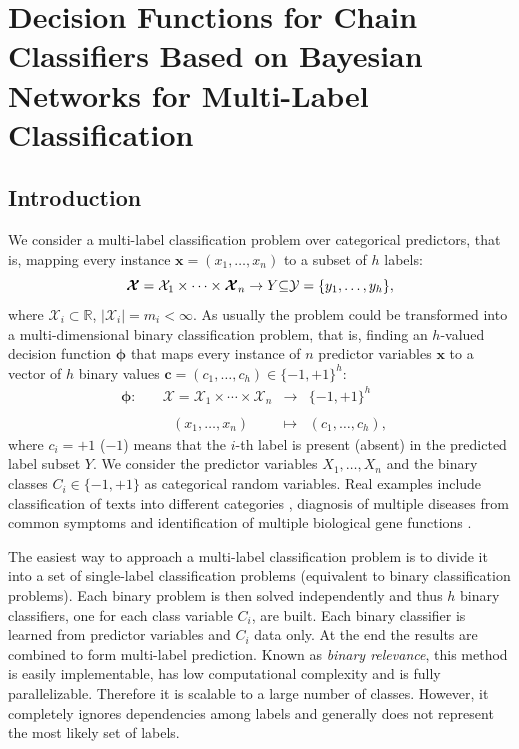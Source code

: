 \documentclass[11pt,a4paper, twoside]{book}
\newcommand{\bchi}{\boldsymbol{\mathcal{X}}}
\newcommand{\nchi}{\mathcal{X}}
\begin{document}
\chapter{Decision Functions for Chain Classifiers Based on Bayesian Networks for Multi-Label Classification}

\label{chp:multilabel}

\section{Introduction}
We consider a multi-label classification problem \citep{zhang2013review,Tsoumakas07} over categorical predictors, that is, mapping every instance $\mathbf{x}=(x_1,\ldots,x_n)$ to a subset of $h$ labels:
\[ \bchi= {\nchi}_1\times\cdots\times{ \bchi}_n  \to  Y \textcolor{black}{\subseteq} \mathcal{Y}=\{ y_1,\ldots,y_{h}\}, \]
where ${\nchi}_{i} \subset \mathbb{R}$, $|{ \nchi}_i|=m_i<\infty$.
As usually the problem could be transformed into a multi-dimensional binary classification problem, that is, finding an $h$-valued decision function $\bm{\phi}$ that maps every instance of $n$ predictor variables $\mathbf{x}$ to a vector of $h$ binary values $\mathbf{c}=(c_1,\ldots,c_{h})\in \{-1,+1\}^{h}$:
$$
\begin{array}{ccccc}
\bm{\phi}:\quad &  \bchi={ \nchi}_{1}\times\cdots\times{ \nchi}_{n}  &\to&  \{-1,+1\}^{h} &\\ \\
  &\text{ } (x_1,\ldots,x_n) &\mapsto&  (c_1,\ldots,c_{h}),& 
 \end{array}
$$
where $c_i=+1$ ($-1$) means that the $i$-th label is present (absent) in the predicted label subset $Y$.
We consider the predictor variables $X_1,\ldots,X_n$ and the binary classes $C_i\in \{-1,+1\}$ as categorical random variables.
Real examples include classification of texts into different categories \citep{goncalves}, diagnosis of multiple diseases from common symptoms and identification of multiple biological gene functions \citep{Blockeel,Zhang2007}.

The easiest way to approach a multi-label classification problem is to divide it into a set of single-label classification problems (equivalent to binary classification problems).
Each binary problem is then solved independently and thus $h$ binary classifiers, one for each class variable $C_i$, are built. Each binary classifier is learned from predictor variables and $C_i$ data only. At the end the results are combined to form multi-label prediction. Known as \textit{binary relevance}, this method is easily implementable, has low computational complexity and is fully parallelizable. Therefore it is scalable to a large number of classes. However, it completely ignores dependencies among labels and generally does not represent the most likely set of labels. 
\end{document}
